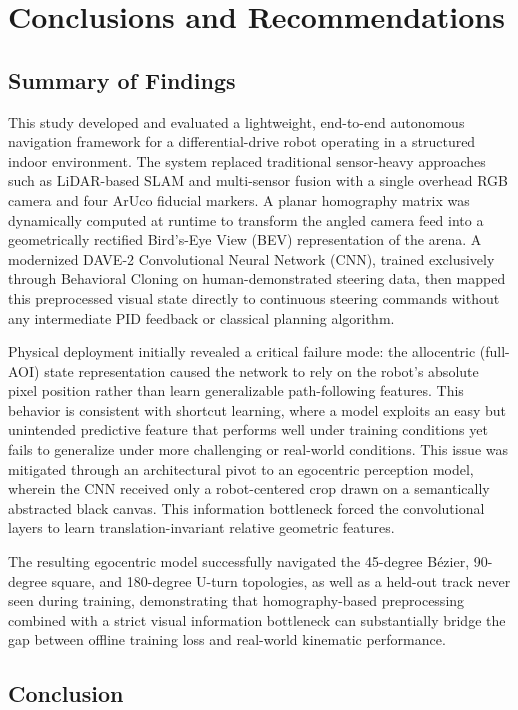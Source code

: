 \chapter{Conclusions and Recommendations}

\section{Summary of Findings}

This study developed and evaluated a lightweight, end-to-end autonomous navigation framework for a differential-drive robot operating in a structured indoor environment. The system replaced traditional sensor-heavy approaches such as LiDAR-based SLAM and multi-sensor fusion with a single overhead RGB camera and four ArUco fiducial markers. A planar homography matrix was dynamically computed at runtime to transform the angled camera feed into a geometrically rectified Bird's-Eye View (BEV) representation of the arena. A modernized DAVE-2 Convolutional Neural Network (CNN), trained exclusively through Behavioral Cloning on human-demonstrated steering data, then mapped this preprocessed visual state directly to continuous steering commands without any intermediate PID feedback or classical planning algorithm.

Physical deployment initially revealed a critical failure mode: the allocentric (full-AOI) state representation caused the network to rely on the robot's absolute pixel position rather than learn generalizable path-following features. This behavior is consistent with shortcut learning, where a model exploits an easy but unintended predictive feature that performs well under training conditions yet fails to generalize under more challenging or real-world conditions. This issue was mitigated through an architectural pivot to an egocentric perception model, wherein the CNN received only a robot-centered crop drawn on a semantically abstracted black canvas. This information bottleneck forced the convolutional layers to learn translation-invariant relative geometric features.

The resulting egocentric model successfully navigated the 45-degree B\'ezier, 90-degree square, and 180-degree U-turn topologies, as well as a held-out track never seen during training, demonstrating that homography-based preprocessing combined with a strict visual information bottleneck can substantially bridge the gap between offline training loss and real-world kinematic performance.

\section{Conclusion}

